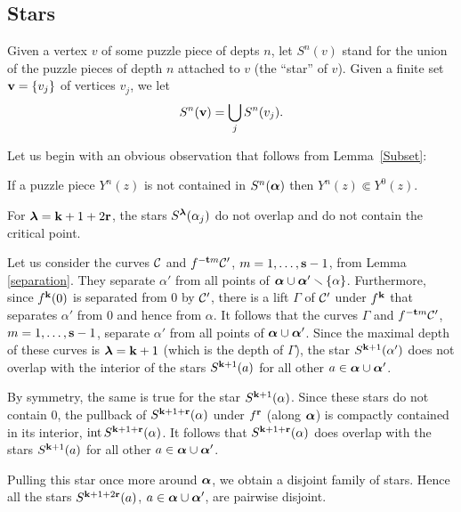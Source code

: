 \subsection{Stars}\label{stars}


Given a vertex $v$ of some puzzle piece of depts $n$,
let $S^n(v)$ stand for the union of the puzzle pieces of depth $n$ attached to $v$
(the ``star'' of $v$).
Given a finite set ${\bf v}=\{v_j\}$ of vertices $v_j$, we let
$$
       S^n({\bf v})=\bigcup_j S^n(v_j). 
$$

  Let us begin with an obvious observation that follows from Lemma~\ref{Subset}:

\begin{lem}\label{compactly conained}
  If a puzzle piece $Y^n(z)$ is not contained in $S^n({\mbox{\boldmath$\alpha$} })$
then $Y^n(z)\Subset Y^0(z)$.
\end{lem}


\begin{lem}\label{single point}
  For ${\boldsymbol{\lambda}}={\mathbf{k}} + 1+2{\mathbf{r}}$, the stars $S^{{\boldsymbol{\lambda}}}(\alpha_j)$ do not overlap and do not contain the critical point. 
\end{lem}

\begin{pf}
Let us consider the  curves ${\mathcal C}$ and $f^{-{\mathbf{t}} m} {\mathcal C}'$, $m=1,\dots, {\mathbf{s}}-1$,  from Lemma \ref{separation}. 
They separate $\alpha'$ from all points of ${\mbox{\boldmath$\alpha$} }\cup {\mbox{\boldmath$\alpha$} }'\smallsetminus \{\alpha\}$. 
Furthermore, since $f^{{\mathbf{k}}}(0)$ is separated from $0$ by ${\mathcal C}'$,
there is a lift $\Gamma$ of ${\mathcal C}'$ under $f^{{\mathbf{k}}}$ that separates $\alpha'$ from $0$ 
and hence from $\alpha$.  It follows that the curves $\Gamma$ and $f^{-{\mathbf{t}} m} {\mathcal C}'$, $m=1,\dots, {\mathbf{s}}-1$,
separate $\alpha'$ from all points of ${\mbox{\boldmath$\alpha$} }\cup {\mbox{\boldmath$\alpha$} }'$. 
Since the maximal depth of these curves is  ${\boldsymbol{\lambda}}={\mathbf{k}} +1$ (which is the depth of $\Gamma$),
the star $S^{{\mathbf{k}}+1}(\alpha')$ does not overlap with the interior of the stars $S^{{\mathbf{k}}+1}(a)$
for all  other $a\in {\mbox{\boldmath$\alpha$} }\cup{\mbox{\boldmath$\alpha$} }'$.

By symmetry, the same is true for the star $S^{{\mathbf{k}}+1}(\alpha)$.
Since these stars  do not contain $0$,
the pullback of $S^{{\mathbf{k}}+1+{\mathbf{r}}}(\alpha)$  under $f^{\mathbf{r}}$ (along ${\mbox{\boldmath$\alpha$} }$) is compactly contained in 
its interior, $\operatorname{int} S^{{\mathbf{k}}+1+{\mathbf{r}}}(\alpha)$.
It follows that $S^{{\mathbf{k}}+1+{\mathbf{r}}}(\alpha)$ does overlap with the stars
$S^{{\mathbf{k}}+1}(a)$ for all  other $a\in {\mbox{\boldmath$\alpha$} }\cup{\mbox{\boldmath$\alpha$} }'$.

Pulling this star once more around ${\mbox{\boldmath$\alpha$} }$, 
we obtain a disjoint family of stars.
Hence all the stars $S^{{\mathbf{k}}+1+2{\mathbf{r}}}(a)$,  $a\in {\mbox{\boldmath$\alpha$} }\cup{\mbox{\boldmath$\alpha$} }'$,
are pairwise disjoint. 
\end{pf}

